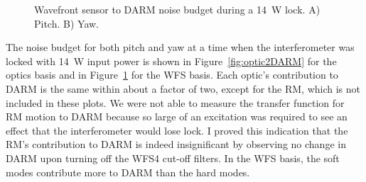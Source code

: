 \begin{figure}
\begin{centering}
\caption[WFS to DARM noise budget]{Wavefront sensor to
  DARM noise budget during a 14~W lock. A) Pitch. B) Yaw.} %
\label{fig:wfs2DARM}
\end{centering}
\end{figure}

The noise budget for both pitch and yaw at a time when the
interferometer was locked with 14~W input power is shown in
Figure~\ref{fig:optic2DARM} for the optics basis and in
Figure~\ref{fig:wfs2DARM} for the WFS basis. Each optic's contribution
to DARM is the same within about a factor of two, except for the RM,
which is not included in these plots. We were not able to measure the
transfer function for RM motion to DARM because so large of an
excitation was required to see an effect that the interferometer would
lose lock. I proved this indication that the RM's contribution to DARM
is indeed insignificant by observing no change in DARM upon turning
off the WFS4 cut-off filters. In the WFS basis, the soft modes
contribute more to DARM than the hard modes.

